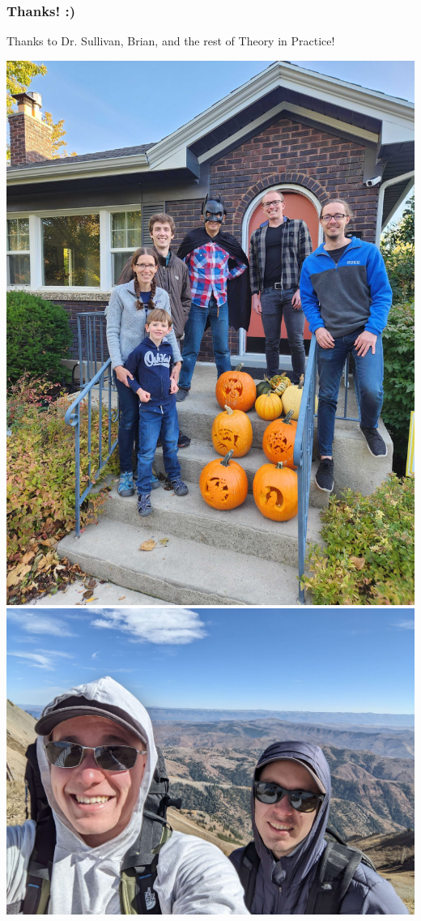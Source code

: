 \begin{frame}[t]
    \frametitle{Thanks! :)}
    Thanks to Dr. Sullivan, Brian, and the rest of Theory in Practice!

    \begin{center}
        \includegraphics[scale=0.05]{figures/pumpkin.jpg}
        \hspace{0.25cm}
        \includegraphics[scale=0.04]{figures/hiking.jpg}
    \end{center}

\end{frame}

